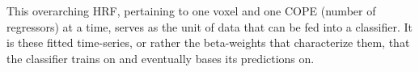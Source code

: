 This overarching \gls{HRF}, pertaining to one voxel and one \gls{COPE} (number of regressors) at a time, serves as the unit of data that can be fed into a classifier. It is these fitted time-series, or rather the beta-weights that characterize them, that the classifier trains on and eventually bases its predictions on.










